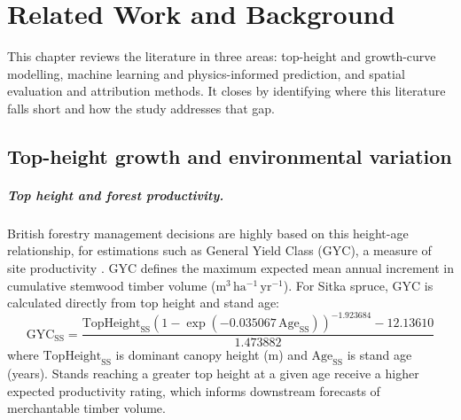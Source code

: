 \newcommand{\fc}[1]{\textcolor{red}{[FactC: #1]}} 
\newcommand{\ct}[1]{\textcolor{orange}{[CITE: #1]}} 
\newcommand{\app}[1]{\textcolor{blue}{[APP: #1]}} 
\newcommand{\sr}[1]{\textcolor{teal}{[Sreword: #1]}}
\newcommand{\fig}[1]{\textcolor{purple}{[FIG: #1]}}
\newcommand{\ai}[1]{\textcolor{brown}{[AI: #1]}}


\chapter{Related Work and Background}
\label{ch:background}

This chapter reviews the literature in three areas: top-height and growth-curve modelling, machine learning and physics-informed prediction, and spatial evaluation and attribution methods. It closes by identifying where this literature falls short and how the study addresses that gap.


\section{Top-height growth and environmental variation} 
\label{sec:background-top-height}

\paragraph*{Top height and forest productivity.}
British forestry management decisions are highly based on this height-age relationship, for estimations such as General Yield Class (GYC), a measure of site productivity \cite{edwards1981Yield_C1_SS,ForestResearch2026Sitka_C1_SS}. GYC defines the maximum expected mean annual increment in cumulative stemwood timber volume ($\mathrm{m^3\,ha^{-1}\,yr^{-1}}$). For Sitka spruce, GYC is calculated directly from top height and stand age:
\begin{equation}
\mathrm{GYC}_{\mathrm{SS}} = \frac{\mathrm{TopHeight}_{\mathrm{SS}} \left(1 - \exp(-0.035067\,\mathrm{Age}_{\mathrm{SS}})\right)^{-1.923684} - 12.13610}{1.473882}
\label{eq:gyc-ss}
\end{equation}
where $\mathrm{TopHeight}_{\mathrm{SS}}$ is dominant canopy height (m) and $\mathrm{Age}_{\mathrm{SS}}$ is stand age (years). Stands reaching a greater top height at a given age receive a higher expected productivity rating, which informs downstream forecasts of merchantable timber volume.

